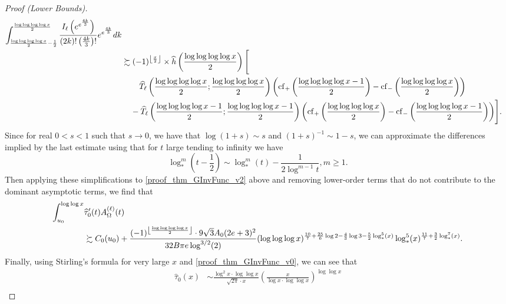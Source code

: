 \documentclass[11pt,reqno,a4letter]{article}
\numberwithin{figure}{section}
\numberwithin{table}{section}
\newcommand{\Floor}[2]{\ensuremath{\left\lfloor \frac{#1}{#2} \right\rfloor}}
\theoremstyle{plain}
\numberwithin{theorem}{section}
\theoremstyle{definition}
\begin{document}
\begin{proof}[Proof (Lower Bounds)]
\begin{align}
     \int_{\frac{\log\log\log\log x}{2}-\frac{1}{2}}^{\frac{\log\log\log\log x}{2}} 
     \frac{I_{\ell}\left(e^{e^{\frac{4k}{3}}}\right)}{(2k)! \left(\frac{4k}{3}\right)!} 
     e^{e^{\frac{4k}{3}}} dk \\ 
\notag 
     & \succsim (-1)^{\Floor{x}{2}} \times \widehat{h}\left(\frac{\log\log\log\log x}{2}\right) \Biggl[ \\ 
\notag 
     & \phantom{\succsim\ - } 
     \widehat{T}_{\ell}\left(\frac{\log\log\log\log x}{2}; \frac{\log\log\log\log x}{2}\right) \left( 
     \operatorname{cf}_{+}\left(\frac{\log\log\log\log x-1}{2}\right) - 
     \operatorname{cf}_{-}\left(\frac{\log\log\log\log x}{2}\right)
     \right) \\ 
\notag 
     & \phantom{\succsim\ } - 
     \widehat{T}_{\ell}\left(\frac{\log\log\log\log x-1}{2}; \frac{\log\log\log\log x-1}{2}\right) \left( 
     \operatorname{cf}_{+}\left(\frac{\log\log\log\log x}{2}\right) - 
     \operatorname{cf}_{-}\left(\frac{\log\log\log\log x-1}{2}\right)
     \right) 
     \Biggr]. 
\end{align} 
Since for real $0 < s < 1$ such that $s \rightarrow 0$, we have that $\log(1+s) \sim s$ and 
$(1+s)^{-1} \sim 1-s$, we can approximate the differences implied by the 
last estimate using that for $t$ large tending to infinity we have 
\[
     \log_{\ast}^m\left(t - \frac{1}{2}\right) \sim \log_{\ast}^{m}(t) - 
     \frac{1}{2 \log^{m-1} t}, m \geq 1. 
\] 
Then applying these simplifications to 
\eqref{proof_thm_GInvFunc_v2} above and removing lower-order terms that 
do not contribute to the dominant asymptotic terms, we find that 
\begin{align} 
\label{proof_thm_GInvFunc_v3} 
\int_{u_0}^{\log\log x} & \widehat{\tau}_0^{\prime}(t) A_{\Omega}^{(\ell)}(t) \\ 
\notag 
     & \succsim 
      C_0(u_0) + \frac{(-1)^{\Floor{\log\log\log\log x}{2}} \cdot 
      9 \sqrt{3} A_0 (2e+3)^2}{32 B\pi e \log^{3/2}(2)} 
      (\log\log\log x)^{\frac{10}{7} + \frac{25}{6}\log 2 - \frac{4}{3} \log 3 - 
      \frac{5}{2} \log_{\ast}^5(x)} 
      \log_{\ast}^5(x)^{\frac{11}{7} + \frac{3}{2} \log_{\ast}^7(x)}. 
\end{align} 
Finally, using Stirling's formula for very large $x$ and 
\eqref{proof_thm_GInvFunc_v0}, we can see that 
\begin{align*} 
\widehat{\tau}_0(x) & \sim \frac{\log^2 x \cdot \log\log x}{\sqrt{2\pi} \cdot x} \left( 
     \frac{x}{\log x \cdot \log\log x}\right)^{\log\log x} \\ 

\end{align*}
\end{proof}
\end{document}
